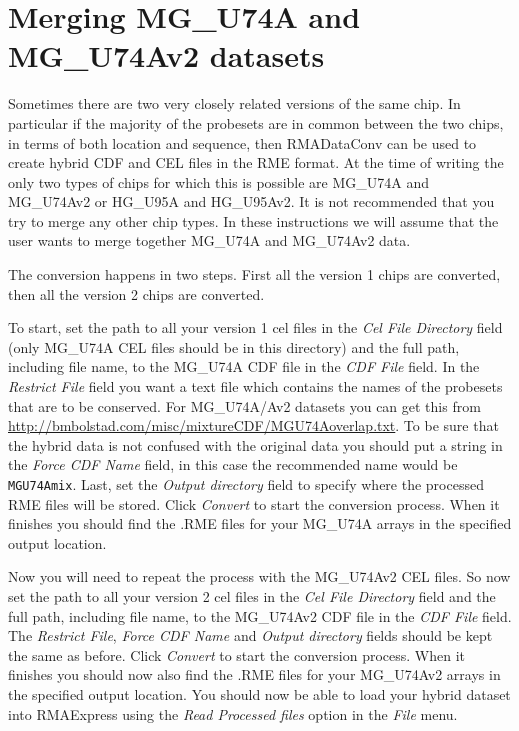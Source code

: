 \documentclass[11pt]{report}
\begin{document}
\section{Merging MG\_U74A and MG\_U74Av2 datasets}

Sometimes there are two very closely related versions of the same chip. In particular if the majority of the probesets are in common between the two chips, in terms of both location and sequence, then RMADataConv can be used to create hybrid CDF and CEL files in the RME format. At the time of writing the only two types of chips for which this is possible are  MG\_U74A and MG\_U74Av2  or HG\_U95A and  HG\_U95Av2. It is not recommended that you try to merge any other chip types. In these instructions we will assume that the user wants to merge together MG\_U74A and MG\_U74Av2 data.

The conversion happens in two steps. First all the version 1 chips are converted, then all the version 2 chips are converted. 

To start, set the path to all your version 1 cel files in the {\it Cel File Directory} field (only MG\_U74A CEL files should be in this directory) and the full path, including file name, to the MG\_U74A CDF file in the {\it CDF File} field. In the {\it Restrict File} field  you want a text file which contains the names of the probesets that are to be conserved. For MG\_U74A/Av2 datasets you can get this from \url{http://bmbolstad.com/misc/mixtureCDF/MGU74Aoverlap.txt}. To be sure that the hybrid data is not confused with the original data you should put a string in the {\it Force CDF Name} field, in this case the recommended name would be {\tt MGU74Amix}. Last, set the {\it Output directory} field to specify where the processed RME files will be stored. Click {\it Convert} to start the conversion process. When it finishes you should find the .RME files for your MG\_U74A arrays in the specified output location. 

Now you will need to repeat the process with the MG\_U74Av2 CEL files. So now set the path to all your version 2 cel files in the {\it Cel File Directory} field and the full path, including file name, to the MG\_U74Av2 CDF file in the {\it CDF File} field. The {\it Restrict File},  {\it Force CDF Name} and  {\it Output directory} fields should be kept the same as before. Click {\it Convert} to start the conversion process. When it finishes you should now also find the .RME files for your MG\_U74Av2 arrays in the specified output location. You should now be able to load your hybrid dataset into RMAExpress using the {\it Read Processed files} option in the {\it File} menu.
\end{document}
